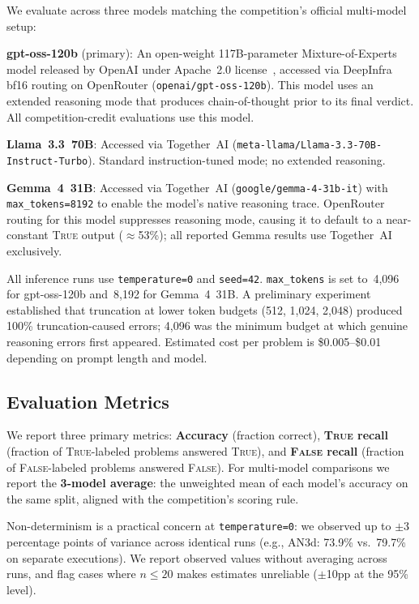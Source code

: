 \documentclass[11pt]{article}
\begin{document}
We evaluate across three models matching the competition's official
multi-model setup:

\textbf{gpt-oss-120b} (primary): An open-weight 117B-parameter
Mixture-of-Experts model released by OpenAI under Apache~2.0
license~\citep{openai2025gptoss}, accessed via DeepInfra bf16 routing
on OpenRouter (\texttt{openai/gpt-oss-120b}). This model uses an
extended reasoning mode that produces chain-of-thought prior to its
final verdict. All competition-credit evaluations use this model.

\textbf{Llama~3.3~70B}: Accessed via Together~AI
(\texttt{meta-llama/Llama-3.3-70B-Instruct-Turbo}). Standard
instruction-tuned mode; no extended reasoning.

\textbf{Gemma~4~31B}: Accessed via Together~AI
(\texttt{google/gemma-4-31b-it}) with \texttt{max\_tokens=8192} to
enable the model's native reasoning trace. OpenRouter routing for this
model suppresses reasoning mode, causing it to default to a
near-constant \textsc{True} output ($\approx$53\%); all reported Gemma
results use Together~AI exclusively.

All inference runs use \texttt{temperature=0} and \texttt{seed=42}.
\texttt{max\_tokens} is set to~4{,}096 for gpt-oss-120b and~8{,}192
for Gemma~4~31B. A preliminary experiment established that truncation
at lower token budgets (512, 1{,}024, 2{,}048) produced 100\%
truncation-caused errors; 4{,}096 was the minimum budget at which
genuine reasoning errors first appeared. Estimated cost per problem is
\$0.005--\$0.01 depending on prompt length and model.

\subsection{Evaluation Metrics}

We report three primary metrics:
\textbf{Accuracy} (fraction correct),
\textbf{\textsc{True} recall} (fraction of \textsc{True}-labeled
problems answered \textsc{True}), and
\textbf{\textsc{False} recall} (fraction of \textsc{False}-labeled
problems answered \textsc{False}).
For multi-model comparisons we report the \textbf{3-model average}:
the unweighted mean of each model's accuracy on the same split, aligned
with the competition's scoring rule.

Non-determinism is a practical concern at \texttt{temperature=0}: we
observed up to $\pm$3 percentage points of variance across identical
runs (e.g., AN3d: 73.9\% vs.\ 79.7\% on separate executions). We
report observed values without averaging across runs, and flag cases
where $n \leq 20$ makes estimates unreliable ($\pm$10pp at the 95\%
level).
\end{document}
